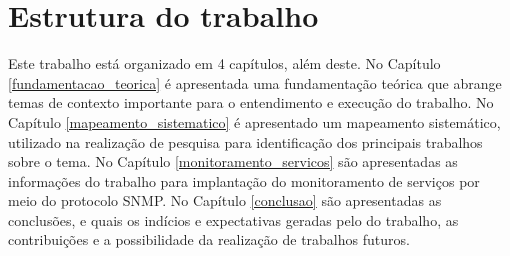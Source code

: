 
\section{Estrutura do trabalho}

Este trabalho está organizado em 4 capítulos, além deste. No Capítulo \ref{fundamentacao_teorica} é apresentada uma fundamentação teórica que abrange temas de contexto importante para o entendimento e execução do trabalho. No Capítulo \ref{mapeamento_sistematico} é apresentado um mapeamento sistemático, utilizado na realização de pesquisa para identificação dos principais trabalhos sobre o tema. No Capítulo \ref{monitoramento_servicos} são apresentadas as informações do trabalho para implantação do monitoramento de serviços por meio do protocolo \acrshort{SNMP}. No Capítulo \ref{conclusao} são apresentadas as conclusões, e quais os indícios e expectativas geradas pelo do trabalho, as contribuições e a possibilidade da realização de trabalhos futuros.